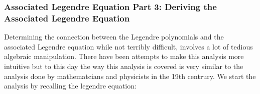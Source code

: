 \documentclass{article}
\begin{document}
    \subsubsection{Associated Legendre Equation Part 3: Deriving the Associated Legendre Equation}

    Determining the connection between the Legendre polynomials and the associated Legendre equation while not terribly difficult, involves a lot of tedious algebraic manipulation.
    There have been attempts to make this analysis more intuitive but to this day the way this analysis is covered is very similar to the analysis done by mathematcians and physicists
    in the 19th centrury. We start the analysis by recalling the legendre equation:

\begin{comment}
    We start the analysis by recalling the generating function of the Legendre polynomials:


    \begin{equation}
        g(t, r) = \frac{1}{\sqrt{1 + r^2 - 2rt}}
    \end{equation}

    Recall also how the generating function related to the Legendre polynomials $P_l(t)$:

    \begin{equation}
        g(t, r) = \sum_{l = 0}^{\infty}P_l(t)r^l
    \end{equation}

    By lack of any direction to take, let us play around with the generating function by differentiating it a number of times, say $m \in \mathbb{N}$, w.r.t to t:


\end{comment}
\end{document}
